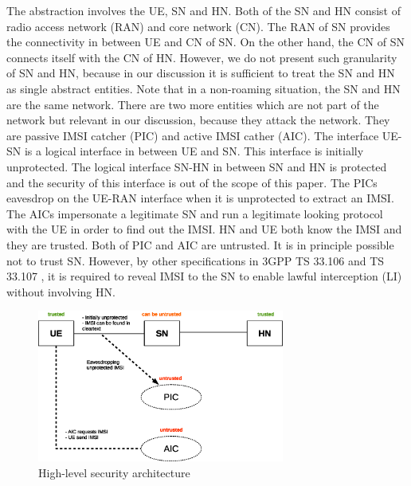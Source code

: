 \documentclass[runningheads,a4paper]{llncs} %
\begin{document}
The abstraction involves the UE, SN and HN. Both of the SN and HN consist of radio access network (RAN) and core network (CN). The RAN of SN provides the connectivity in between UE and CN of SN. On the other hand, the CN of SN connects itself with the CN of HN. However, we do not present such granularity of SN and HN, because in our discussion it is sufficient to treat the SN and HN as single abstract entities. Note that in a non-roaming situation, the SN and HN are the same network. There are two more entities which are not part of the network but relevant in our discussion, because they attack the network. They are passive IMSI catcher (PIC) and active IMSI cather (AIC). The interface UE-SN is a logical interface in between UE and SN. This interface is initially unprotected. The logical interface SN-HN in between SN and HN is protected and the security of this interface is out of the scope of this paper. The PICs eavesdrop on the UE-RAN interface when it is unprotected to extract an IMSI. The AICs impersonate a legitimate SN and run a legitimate looking protocol with the UE in order to find out the IMSI. HN and UE both know the IMSI and they are trusted. Both of PIC and AIC are untrusted. It is in principle possible not to trust SN. However, by other specifications in 3GPP TS 33.106 \cite{TS33106} and TS 33.107 \cite{TS33107}, it is required to reveal IMSI to the SN to enable lawful interception (LI) without involving HN. \begin{figure}
\begin{center}
  \includegraphics[height= 5cm]{security_architecture_abstraction.eps}
\caption{High-level security architecture}
\label{fig:security_architecture_abstraction}       %
\end{center}

\end{figure}
\end{document}
